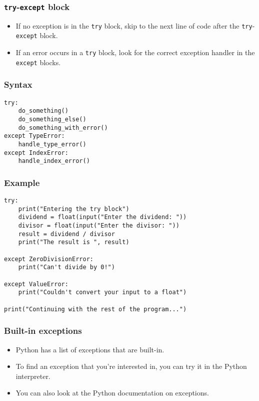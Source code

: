 \documentclass[11pt]{article}
\begin{document}
\subsubsection{\texttt{try}-\texttt{except} block}
\label{sec:org2e521aa}
\begin{itemize}
\item If no exception is in the \texttt{try} block, skip to the next line of code after the \texttt{try}-\texttt{except} block.
\item If an error occurs in a \texttt{try} block, look for the correct exception handler in the \texttt{except} blocks.
\end{itemize}
\subsubsection{Syntax}
\label{sec:org6433ff5}
\begin{verbatim}
try:
    do_something()
    do_something_else()
    do_something_with_error()
except TypeError:
    handle_type_error()
except IndexError:
    handle_index_error()
\end{verbatim}
\subsubsection{Example}
\label{sec:org371f317}
\begin{verbatim}
try:
    print("Entering the try block")
    dividend = float(input("Enter the dividend: "))
    divisor = float(input("Enter the divisor: "))
    result = dividend / divisor
    print("The result is ", result)

except ZeroDivisionError:
    print("Can't divide by 0!")

except ValueError:
    print("Couldn't convert your input to a float")

print("Continuing with the rest of the program...")
\end{verbatim}
\subsubsection{Built-in exceptions}
\label{sec:org03b85a4}
\begin{itemize}
\item Python has a list of exceptions that are built-in.
\item To find an exception that you're interested in, you can try it in the Python interpreter.
\item You can also look at the Python documentation on exceptions.
\end{itemize}
\end{document}
